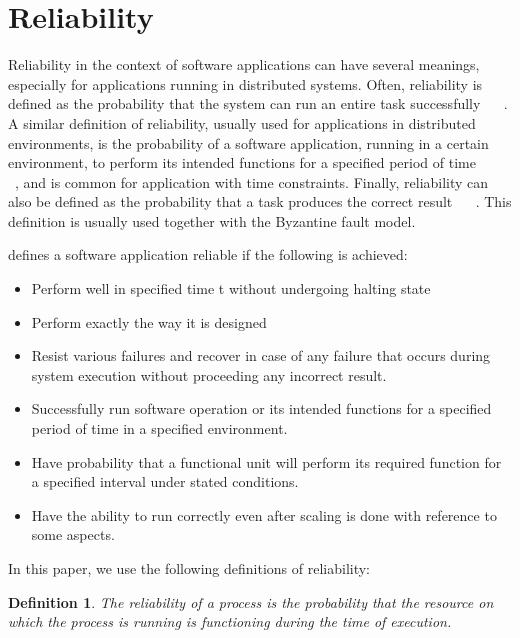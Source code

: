 \documentclass{cslthse-msc}
\newtheorem{definition}{Definition}[chapter]
\begin{document}
\section{Reliability} \label{sec:background_reliability}
Reliability in the context of software applications can have several meanings, especially for applications running in distributed systems. Often, reliability is defined as the probability that the system can run an entire task successfully ~\cite{taskAllocation} \cite{relModelDistSimSystem} \cite{studyServiceRel} \cite{hierarchicalRelModeling} \cite{generalAlgoRelEval} \cite{realTimeRelAnalysis} \cite{selfAdaptRel} ~\cite{perfRelNonMarkovian}. A similar definition of reliability, usually used for applications in distributed environments, is the probability of a software application, running in a certain environment, to perform its intended functions for a specified period of time ~\cite{surveyReliabilityDistr} ~\cite{surveyRelPrediction} ~\cite{relDistApplications}, and is common for application with time constraints. Finally, reliability can also be defined as the probability that a task produces the correct result ~\cite{surveyRelPrediction} \cite{relAndPerfGridServices} \cite{relGridServicePredConstraint} \cite{relModelWebServices} ~\cite{selfAdaptRel}. This definition is usually used together with the Byzantine fault model. 

\cite{surveyReliabilityDistr} defines a software application reliable if the following is achieved:
\begin{itemize}
\item Perform well in specified time t without undergoing halting state
\item Perform exactly the way it is designed
\item Resist various failures and recover in case of any failure that occurs during system execution without proceeding any incorrect result.
\item Successfully run software operation or its intended functions for a specified period of time in a specified environment.
\item Have probability that a functional unit will perform its required function for a specified interval under stated conditions.
\item Have the ability to run correctly even after scaling is done with reference to some aspects.
\end{itemize}

In this paper, we use the following definitions of reliability:
\begin{definition} \label{def:single_task_reliability}
The reliability of a process is the probability that the resource on which the process is running is functioning during the time of execution.
\end{definition}
\end{document}
